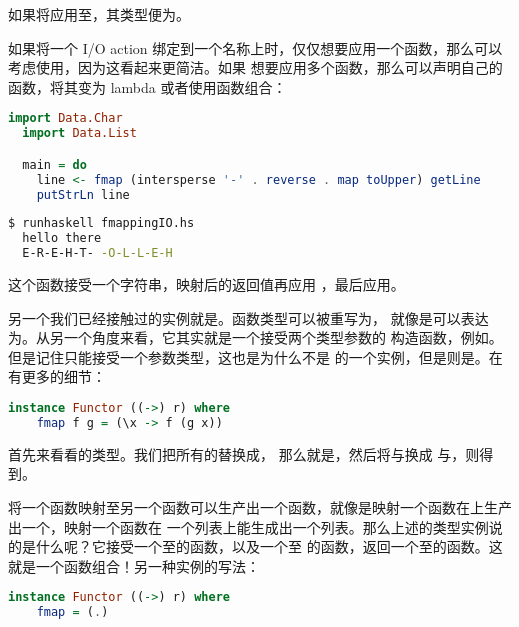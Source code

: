 \documentclass[./main.tex]{subfiles}
\begin{document}
如果将应用至，其类型便为。

如果将一个 I/O action 绑定到一个名称上时，仅仅想要应用一个函数，那么可以考虑使用，因为这看起来更简洁。如果
想要应用多个函数，那么可以声明自己的函数，将其变为 lambda 或者使用函数组合：

\begin{lstlisting}[language=Haskell]
  import Data.Char
  import Data.List

  main = do
    line <- fmap (intersperse '-' . reverse . map toUpper) getLine
    putStrLn line
\end{lstlisting}

\begin{lstlisting}[language=Bash]
  $ runhaskell fmappingIO.hs
  hello there
  E-R-E-H-T- -O-L-L-E-H
\end{lstlisting}

这个函数接受一个字符串，映射后的返回值再应用
，最后应用。

另一个我们已经接触过的实例就是。函数类型可以被重写为，
就像是可以表达为。从另一个角度来看，它其实就是一个接受两个类型参数的
构造函数，例如。但是记住只能接受一个参数类型，这也是为什么\acode{(->)}不是
的一个实例，但是则是。在有更多的细节：

\begin{lstlisting}[language=Haskell]
  instance Functor ((->) r) where
    fmap f g = (\x -> f (g x))
\end{lstlisting}

首先来看看的类型。我们把所有的替换成，
那么就是，然后将与换成
与，则得到。

将一个函数映射至另一个函数可以生产出一个函数，就像是映射一个函数在上生产出一个，映射一个函数在
一个列表上能生成出一个列表。那么上述的类型实例说的是什么呢？它接受一个至的函数，以及一个至
的函数，返回一个至的函数。这就是一个函数组合！另一种实例的写法：

\begin{lstlisting}[language=Haskell]
  instance Functor ((->) r) where
    fmap = (.)
\end{lstlisting}
\end{document}

